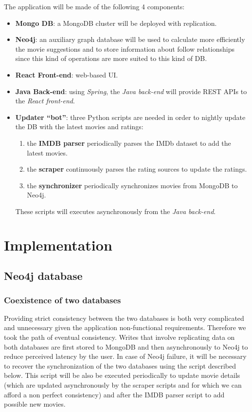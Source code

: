\documentclass[11pt]{article}
\begin{document}
The application will be made of the following 4 components:
\begin{itemize}
	\item \textbf{Mongo DB}: a MongoDB cluster will be deployed with
		replication.
	\item \textbf{Neo4j}: an auxiliary graph database will be used to 	
		calculate more efficiently the movie suggestions and to store 
        information about follow relationships since this kind of operations
        are more suited to this kind of DB.
	\item \textbf{React Front-end}: web-based UI.
	\item \textbf{Java Back-end}: using \emph{Spring}, the \emph{Java back-end} will provide REST APIs to the \emph{React front-end}.
	\item \textbf{Updater ``bot''}: three Python scripts are needed in order to nightly update the DB with the latest movies and ratings: 
	\begin{enumerate}
		\item the \textbf{IMDB parser} periodically parses the IMDb dataset to add the latest movies.
		\item the \textbf{scraper} continuously parses the rating sources to update the ratings.
		\item the \textbf{synchronizer} periodically synchronizes movies from MongoDB to Neo4j.
	\end{enumerate}
	These scripts will executes asynchronously from the \emph{Java back-end}.
\end{itemize}

\section{Implementation}

\subsection{Neo4j database}

\subsubsection{Coexistence of two databases}

Providing strict consistency between the two databases is both very complicated
and unnecessary given the application non-functional requirements. Therefore 
we took the path of eventual consistency. Writes that 
involve replicating data on both databases are first stored to MongoDB and then 
asynchronously to Neo4j to reduce perceived latency by the user. 
In case of Neo4j failure, it will be necessary to recover the synchronization 
of the two databases using the script described below. 
This script will be also be executed periodically to update movie details 
(which are updated asynchronously by the scraper scripts and for which we can 
afford a non perfect consistency) and after the IMDB parser script to add 
possible new movies. 
\end{document}
